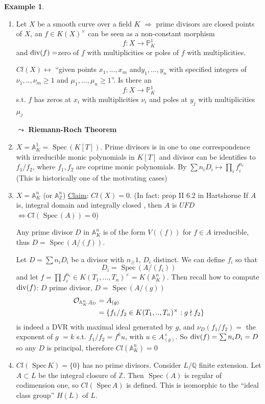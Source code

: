 \documentclass[11pt]{article}
\theoremstyle{definition}
\newtheorem{ex}[thm]{Example}
\newcommand{\spec}{\text{ Spec}\,}
\newcommand{\affn}{\mathbb A}
\newcommand{\proj}{\mathbb P}
\newcommand{\intg}{\mathbb Z}
\newcommand{\ratl}{\mathbb Q}
\newcommand{\calo}{{\cal O}}
\renewcommand{\div}{\textnormal{div}}
\newcommand{\Lrta}{\Longrightarrow}
\newcommand{\lrta}{\longrightarrow}
\newcommand{\llrta}{\longleftrightarrow}
\newcommand{\Llrta}{\Longleftrightarrow}
\begin{document}
\begin{ex}\ 
\begin{enumerate}[label=(\arabic*)]
\item
Let $X$ be  a smooth curve over a field $K$
$\Lrta$ prime divisors are closed points of $X$, an $f\in K(X)^\times$ can be seen as a non-constant morphism 
$$
f:X\lrta \proj^1_K
$$
and $\div(f)=$zero of $f$ with multiplicities or poles of $f$ with multiplicities.

$Cl(X)\llrta$ ``given points $x_1,...,x_m$ and$y_1,...,y_n$  with specified integers of $\nu_1,..,\nu_m\geq 1$ and $\mu_1,...,\mu_n\geq 1$''. Is there an 
$$
f: X\lrta \proj^1_K
$$
s.t. $f$ has zeros at $x_i$ with multiplicities $\nu_i$ and poles at $y_j$ with multiplicities $\mu_j$

$\leadsto$ \textbf{Riemann-Roch Theorem}
\item $X=\affn^1_K=\spec(K[T])$. Prime divisors is in one to one correspondence with irreducible monic polynomials in $K[T]$ and divisor can be identifies to $f_1/f_2$, where $f_1,f_2$ are coprime monic polynomials. By $\sum n_i D_i\mapsto \prod_i f_i^{n_i}$ 
(This is historically one of the motivating cases)
\item $X=\affn^n_K$ (or $\affn^n_\intg$)
\underline{Claim}: $Cl(X)=0$.
(In fact: prop II 6.2 in Hartshorne If $A$ is, integral domain and integrally closed , then $A$ is $UFD$ $\Llrta Cl(\spec(A))=0$)

Any prime divisor $D$ in $\affn^n_K$ is of the form $V((f))$ for $f\in A$ irreducible, thus $D=\spec(A/(f))$.

 Let $D=\sum n_i D_i$ be a divisor with $n_\geq 1$, $D_i$ distinct. We can define $f_i$ so that
 $$
D_i=\spec(A/(f_i))
 $$
 and let $f=\prod f_i^{n_i}\in K(T_1,...,T_n)^\times=K(\affn^n_K)$.
 Then recall how to compute $\div(f)$: $D$ prime divisor, $D=\spec(A/(g))$
 $$
 \begin{aligned}
 \calo_{\affn^n_K,\tilde{\eta}_D}
 &=A_{(g)}\\
 &=\{f_1/f_2\in K(T_1,..,T_n)^\times: g\nmid f_2\}
 \end{aligned}
 $$
 is indeed a DVR with maximal ideal generated by $g$, and $\nu_D(f_1/f_2)=$ the exponent of $g$ $=k$ s.t. 
 $f_1/f_2=f^k u$, with $u\in A_{(g)}^\times$. So $\div(f)=\sum n_i D_i=D$ so any $D$ is principal, therefore $Cl(\affn^n_K)=0$

\item $Cl(\spec K)=\{0\}$ has no prime divisors. Consider $L/\ratl$ finite extension. Let $A\subset L$ be the integral closure of $\intg$. Then $\spec(A)$ is regular of codimension one, so 
$
Cl(\spec A)
$
is defined.
This is isomorphic to the ``ideal class group'' $H(L)$ of $L$.


\end{enumerate}
\end{ex}
\end{document}
